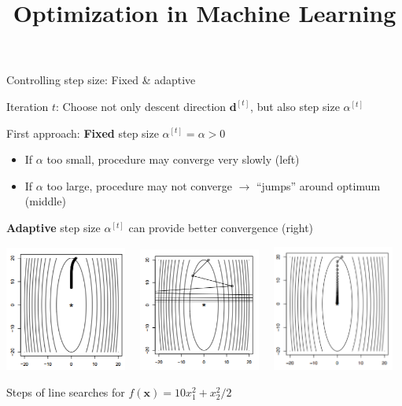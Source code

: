 \documentclass[11pt,compress,t,notes=noshow, xcolor=table]{beamer}
\title{Optimization in Machine Learning}
\date{}
\begin{document}
\sloppy

	

	\begin{vbframe}{Controlling step size: Fixed \& adaptive}
		
		Iteration $t$: Choose not only descent direction $\mathbf{d}^{[t]}$, but also step size $\alpha^{[t]}$

        \medskip
  
        First approach: \textbf{Fixed} step size $\alpha^{[t]} = \alpha > 0$
        \begin{footnotesize}
            \begin{itemize}
                \item If $\alpha$ too small, procedure may converge very slowly (left)
                \item If $\alpha$ too large, procedure may not converge $\rightarrow$ \enquote{jumps} around optimum (middle)
		      \end{itemize}
        \end{footnotesize}
        
        \textbf{Adaptive} step size $\alpha^{[t]}$ can provide better convergence (right)
        
		\begin{center}
			\includegraphics[width = 0.3\textwidth]{figure_man/stepsize_small.png}~~
			\includegraphics[width = 0.3\textwidth]{figure_man/stepsize_large.png}~~
			\includegraphics[width = 0.3\textwidth]{figure_man/stepsize_adaptive.png}
			\begin{footnotesize}
				Steps of line searches for $f(\bm{x}) = 10 x_1^2 + x_2^2/2$
			\end{footnotesize}
		\end{center} 		
		
	\end{vbframe}
	
\end{document}
